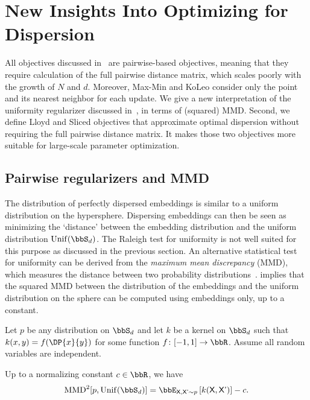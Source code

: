 \documentclass[10pt]{article} %
\newcommand\var[1]{\textsf{#1}}
\begin{document}
\section{New Insights Into Optimizing for Dispersion}
\label{sec:our-work}
All objectives discussed in~ are pairwise-based objectives, meaning that they require calculation of the full pairwise distance matrix, which scales poorly with the growth of $N$ and $d$. Moreover, Max-Min and KoLeo consider only the point and its nearest neighbor for each update. We give a new interpretation of the uniformity regularizer discussed in~, in terms of (squared) MMD. Second, we define Lloyd and Sliced objectives that approximate optimal dispersion without requiring the full pairwise distance matrix. It makes those two objectives more suitable for large-scale parameter optimization.

\subsection{Pairwise regularizers and MMD}

The distribution of perfectly dispersed embeddings is similar to a uniform distribution on the hypersphere. 
Dispersing embeddings can then be seen as minimizing the `distance' between the embedding distribution and the uniform distribution \(\operatorname{Unif}(\bbS_d)\). 
The Raleigh test for uniformity is not well suited for this purpose as discussed in the previous section.
An alternative statistical test for uniformity can be derived from the \textit{maximum mean discrepancy} (MMD), which measures the distance between two probability distributions~\citep{JMLR:v13:gretton12a}.
 implies that the squared MMD between the distribution of the embeddings and the uniform distribution on the sphere can be computed using embeddings only, up to a constant.

\begin{lemma}\label{lemma:mmd}
Let \(p\) be any distribution on \(\bbS_d\) and let \(k\) be a kernel 
on \(\bbS_d\) such that \(k(x, y) = f(\DP{x}{y})\) for some function \(f \colon [-1, 1] \to \bbR\). Assume all random variables are independent. 

Up to a normalizing constant \(c \in \bbR\), we have
\[
\operatorname{MMD}^2[p, \operatorname{Unif}(\bbS_d)] = \bbE_{\var{X}, \var{X'} \sim p} \left[ k(\var{X}, \var{X'}) \right] - c.
\]
\end{lemma}
\end{document}
